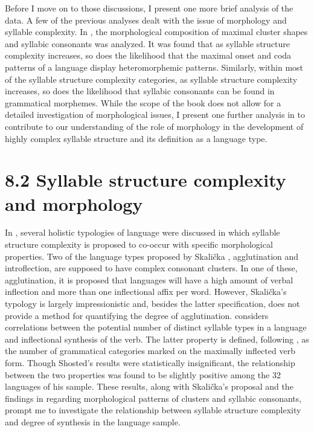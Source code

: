   Before I move on to those discussions, I present one more brief analysis of the data. A few of the previous analyses dealt with the issue of morphology and syllable complexity. In  , the morphological composition of maximal cluster shapes and syllabic consonants was analyzed. It was found that as syllable structure complexity increases, so does the likelihood that the maximal onset and coda patterns of a language display heteromorphemic patterns. Similarly, within most of the syllable structure complexity categories, as syllable structure complexity increases, so does the likelihood that syllabic consonants can be found in grammatical morphemes. While the scope of the book does not allow for a detailed investigation of morphological issues, I present one further analysis in  to contribute to our understanding of the role of morphology in the development of highly complex syllable structure and its definition as a language type.


\section{8.2 Syllable structure complexity and morphology}

  In , several holistic typologies of language were discussed in which syllable structure complexity is proposed to co-occur with specific morphological properties. Two of the language types proposed by Skalička , agglutination and introflection, are supposed to have complex consonant clusters. In one of these, agglutination, it is proposed that languages will have a high amount of verbal inflection and more than one inflectional affix per word. However, Skalička’s typology is largely impressionistic and, besides the latter specification, does not provide a method for quantifying the degree of agglutination. \citet{Shosted2006} considers correlations between the potential number of distinct syllable types in a language and inflectional synthesis of the verb. The latter property is defined, following \citet{BickelNichols2005}, as the number of grammatical categories marked on the maximally inflected verb form. Though Shosted’s results were statistically insignificant, the relationship between the two properties was found to be slightly positive among the 32 languages of his sample. These results, along with Skalička’s proposal and the findings in  regarding morphological patterns of clusters and syllabic consonants, prompt me to investigate the relationship between syllable structure complexity and degree of synthesis in the language sample.



